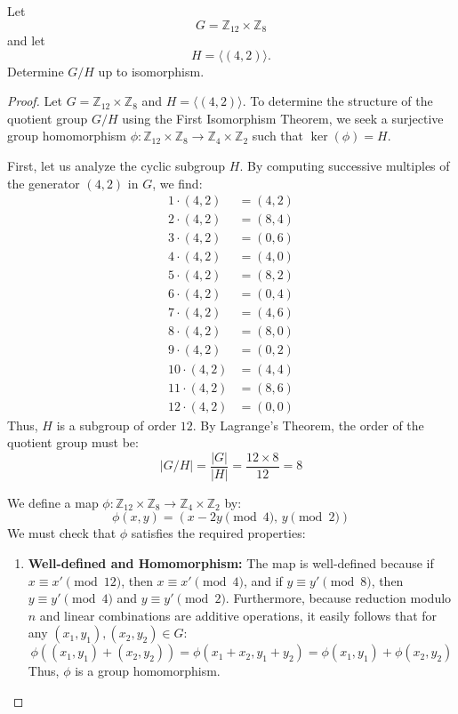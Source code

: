 \begin{prob}
    Let 
    \[
        G = \mathbb Z_{12} \times \mathbb Z_8
    \]
    and let 
    \[
        H = \langle (4,2) \rangle.
    \]
    Determine $G/H$ up to isomorphism.
\end{prob}

\begin{proof}
Let $G = \mathbb{Z}_{12} \times \mathbb{Z}_8$ and $H = \langle (4,2) \rangle$. To determine the structure of the quotient group $G/H$ using the First Isomorphism Theorem, we seek a surjective group homomorphism $\phi: \mathbb{Z}_{12} \times \mathbb{Z}_8 \to \mathbb{Z}_4 \times \mathbb{Z}_2$ such that $\ker(\phi) = H$.

First, let us analyze the cyclic subgroup $H$. By computing successive multiples of the generator $(4,2)$ in $G$, we find:
\begin{align*}
1 \cdot (4,2) &= (4,2) \\
2 \cdot (4,2) &= (8,4) \\
3 \cdot (4,2) &= (0,6) \\
4 \cdot (4,2) &= (4,0) \\
5 \cdot (4,2) &= (8,2) \\
6 \cdot (4,2) &= (0,4) \\
7 \cdot (4,2) &= (4,6) \\
8 \cdot (4,2) &= (8,0) \\
9 \cdot (4,2) &= (0,2) \\
10 \cdot (4,2) &= (4,4) \\
11 \cdot (4,2) &= (8,6) \\
12 \cdot (4,2) &= (0,0)
\end{align*}
Thus, $H$ is a subgroup of order $12$. By Lagrange's Theorem, the order of the quotient group must be:
\[
|G/H| = \frac{|G|}{|H|} = \frac{12 \times 8}{12} = 8
\]

We define a map $\phi: \mathbb{Z}_{12} \times \mathbb{Z}_8 \to \mathbb{Z}_4 \times \mathbb{Z}_2$ by:
\[
\phi(x, y) = (x - 2y \pmod{4}, \, y \pmod{2})
\]
We must check that $\phi$ satisfies the required properties:

\begin{enumerate}
    \item \textbf{Well-defined and Homomorphism:}
    The map is well-defined because if $x \equiv x' \pmod{12}$, then $x \equiv x' \pmod{4}$, and if $y \equiv y' \pmod{8}$, then $y \equiv y' \pmod{4}$ and $y \equiv y' \pmod{2}$. Furthermore, because reduction modulo $n$ and linear combinations are additive operations, it easily follows that for any $(x_1, y_1), (x_2, y_2) \in G$:
    \[
    \phi((x_1, y_1) + (x_2, y_2)) = \phi(x_1+x_2, y_1+y_2) = \phi(x_1, y_1) + \phi(x_2, y_2)
    \]
    Thus, $\phi$ is a group homomorphism.


\end{enumerate}
\end{proof}
